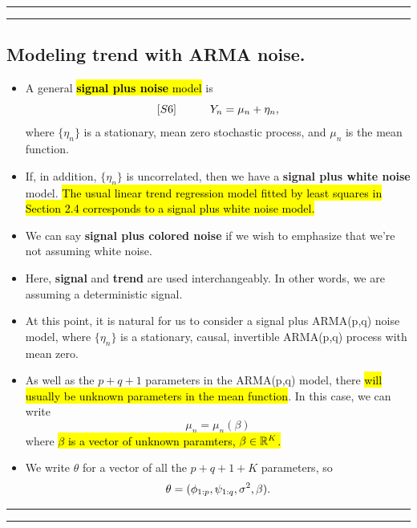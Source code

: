 \documentclass[]{article}
\begin{document}
\begin{center}\rule{0.5\linewidth}{\linethickness}\end{center}

\begin{center}\rule{0.5\linewidth}{\linethickness}\end{center}

\subsection{Modeling trend with ARMA
noise.}\label{modeling-trend-with-arma-noise.}

\begin{itemize}
\item
  A general \hl{\textbf{signal plus noise} model} is
  \[[S6] \quad\quad\quad   Y_n = \mu_n + \eta_n,\] where \(\{\eta_n\}\) is a
  stationary, mean zero stochastic process, and \(\mu_n\) is the mean
  function.
\item
  If, in addition, \(\{\eta_n\}\) is uncorrelated, then we have a
  \textbf{signal plus white noise} model. \hl{The usual linear trend
  regression model fitted by least squares in
  Section 2.4 corresponds to a signal plus white noise model.}
\item
  We can say \textbf{signal plus colored noise} if we wish to emphasize
  that we're not assuming white noise.
\item
  Here, \textbf{signal} and \textbf{trend} are used interchangeably. In
  other words, we are assuming a deterministic signal.
\item
  At this point, it is natural for us to consider a signal plus
  ARMA(p,q) noise model, where \(\{\eta_n\}\) is a stationary, causal,
  invertible ARMA(p,q) process with mean zero.
\item
  As well as the \(p+q+1\) parameters in the ARMA(p,q) model, there \hl{will
  usually be unknown parameters in the mean function}. In this case, we
  can write \[ \mu_n = \mu_n(\beta)\] where \hl{$\beta$ is a vector of
  unknown paramters, $\beta\in\mathbb{R}^K$.}
\item
  We write \(\theta\) for a vector of all the \(p+q+1+K\) parameters, so
  \[\theta = (\phi_{1:p},\psi_{1:q},\sigma^2,\beta).\]
\end{itemize}

\begin{center}\rule{0.5\linewidth}{\linethickness}\end{center}

\begin{center}\rule{0.5\linewidth}{\linethickness}\end{center}
\end{document}
